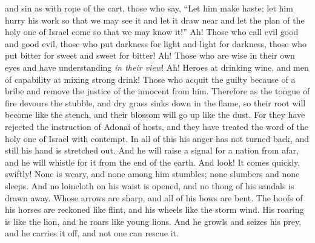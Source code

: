 \begin{biblechapter}
and sin as with rope of the cart,
\verse those who say, 
“Let him make haste; 
let him hurry his work 
so that we may see it 
and let it draw near 
and let the plan of the holy one of Israel come 
so that we may know it!”
\verse Ah! Those who call evil good and good evil, 
those who put darkness for light and light for darkness, 
those who put bitter for sweet and sweet for bitter!
\verse Ah! Those who are wise in their own eyes 
and have understanding \textit{in their view}!
\verse Ah! Heroes at drinking wine, 
and men of capability at mixing strong drink!
\verse Those who acquit the guilty because of a bribe 
and remove the justice of the innocent from him.
\verse Therefore as the tongue of fire devours the stubble, 
and dry grass sinks down in the flame, 
so their root will become like the stench, 
and their blossom will go up like the dust. 
For they have rejected the instruction of Adonai of hosts, 
and they have treated the word of the holy one of Israel with contempt.
 In all of this his anger has not turned back, 
and still his hand is stretched out.
\verse And he will raise a signal for a nation from afar, 
and he will whistle for it from the end of the earth. 
And look! It comes quickly, swiftly!
\verse None is weary, 
and none among him stumbles; 
none slumbers and none sleeps. 
And no loincloth on his waist is opened, 
and no thong of his sandals is drawn away.
\verse Whose arrows are sharp, 
and all of his bows are bent. 
The hoofs of his horses are reckoned like flint, 
and his wheels like the storm wind.
\verse His roaring is like the lion, 
and he roars like young lions. 
And he growls and seizes his prey, 
and he carries it off, 
and not one can rescue it.
\end{biblechapter}

